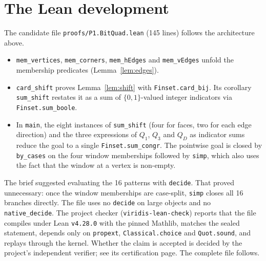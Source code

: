\documentclass[11pt]{article}
\theoremstyle{definition}
\theoremstyle{remark}
\begin{document}
\section{The Lean development}

The candidate file \texttt{proofs/P1.BitQuad.lean} (145 lines) follows the
architecture above.
\begin{itemize}
\item \texttt{mem\_vertices}, \texttt{mem\_corners}, \texttt{mem\_hEdges} and
  \texttt{mem\_vEdges} unfold the membership predicates (Lemma~\ref{lem:edges}).
\item \texttt{card\_shift} proves Lemma~\ref{lem:shift} with
  \texttt{Finset.card\_bij}. Its corollary \texttt{sum\_shift} restates it as a
  sum of $\{0,1\}$-valued integer indicators via \texttt{Finset.sum\_boole}.
\item In \texttt{main}, the eight instances of \texttt{sum\_shift} (four for
  faces, two for each edge direction) and the three expressions of $Q_1$, $Q_3$
  and $Q_D$ as indicator sums reduce the goal to a single
  \texttt{Finset.sum\_congr}. The pointwise goal is closed by
  \texttt{by\_cases} on the four window memberships followed by \texttt{simp},
  which also uses the fact that the window at a vertex is non-empty.
\end{itemize}
The brief suggested evaluating the 16 patterns with \texttt{decide}. That
proved unnecessary: once the window memberships are case-split, \texttt{simp}
closes all 16 branches directly. The file uses no \texttt{decide} on large
objects and no \texttt{native\_decide}. The project checker
(\texttt{viridis-lean-check}) reports that the file compiles under Lean
\texttt{v4.28.0} with the pinned Mathlib, matches the sealed statement, depends
only on \texttt{propext}, \texttt{Classical.choice} and \texttt{Quot.sound}, and
replays through the kernel. Whether the claim is accepted is decided by the
project's independent verifier; see its certification page. The complete file
follows.
\end{document}
